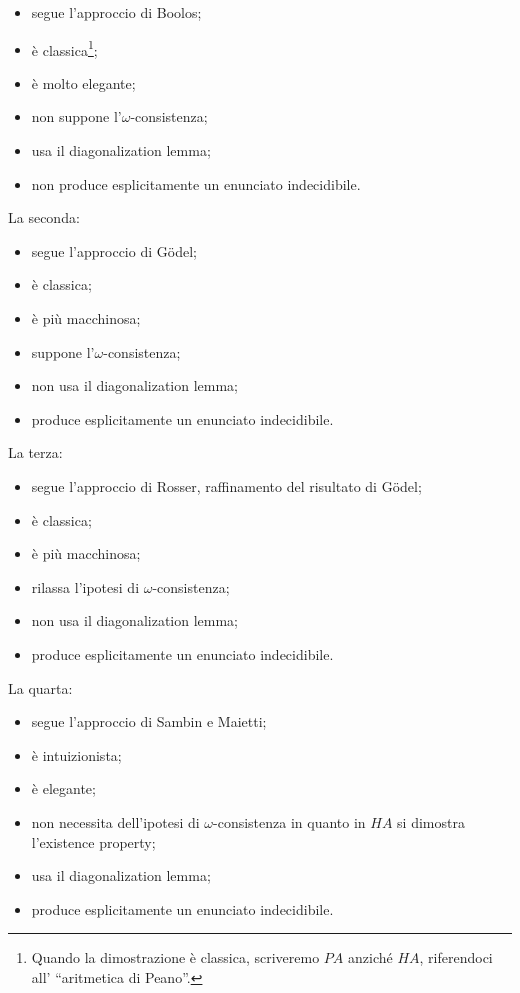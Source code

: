 	\begin{itemize}
	\item segue l'approccio di Boolos;
	\item \`e classica\footnote{Quando la dimostrazione \`e
	classica, scriveremo $PA$ anzich\'e $HA$, riferendoci all'
	``aritmetica di Peano''.};
	\item \`e molto elegante;
	\item non suppone l'$\omega$-consistenza;
	\item usa il diagonalization lemma;
	\item non produce esplicitamente un enunciato indecidibile.
	\end{itemize}
	La seconda:
	\begin{itemize}
	\item segue l'approccio di G\"odel;
	\item \`e classica;
	\item \`e pi\`u macchinosa;
	\item suppone l'$\omega$-consistenza;
	\item non usa il diagonalization lemma;
	\item produce esplicitamente un enunciato indecidibile.
	\end{itemize}
	La terza:
	\begin{itemize}
	\item segue l'approccio di Rosser, raffinamento del risultato di G\"odel;
	\item \`e classica;
	\item \`e pi\`u macchinosa;
	\item rilassa l'ipotesi di $\omega$-consistenza;
	\item non usa il diagonalization lemma;
	\item produce esplicitamente un enunciato indecidibile.
	\end{itemize}
	La quarta:
	\begin{itemize}
	\item segue l'approccio di Sambin e Maietti;
	\item \`e intuizionista;
	\item \`e elegante;
	\item non necessita dell'ipotesi di $\omega$-consistenza in quanto
	in $HA$ si dimostra l'existence property;
	\item usa il diagonalization lemma;
	\item produce esplicitamente un enunciato indecidibile.
	\end{itemize}

